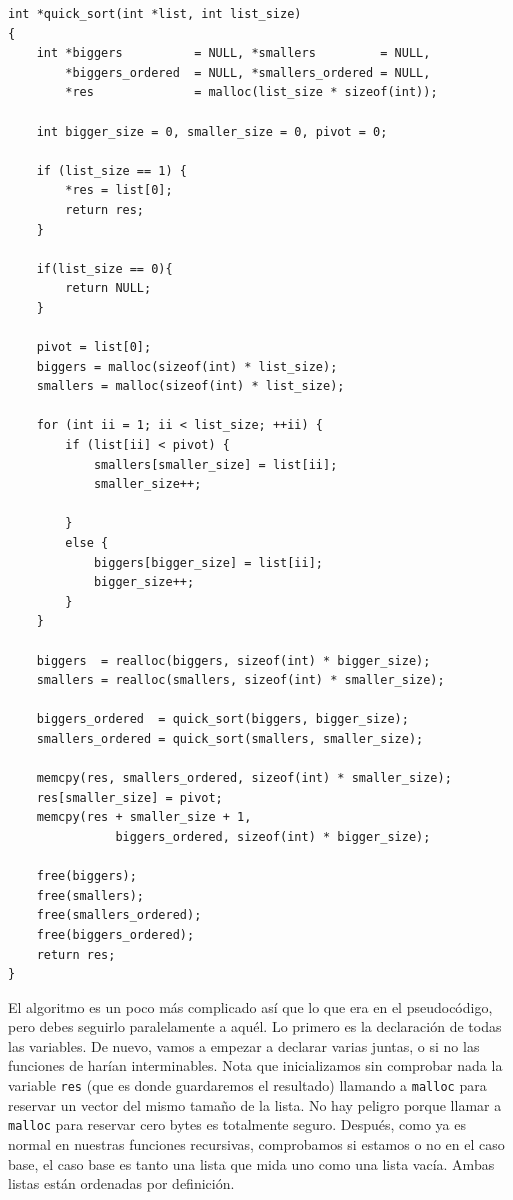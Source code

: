 \documentclass[a4paper]{article}
\begin{document}
\noindent
\begin{minipage}[H]{\linewidth}
\mbox{}
\begin{lstlisting}[style=C,
caption={Implementación de \textit{Quick Sort}},
label={lst:quick_sort}]
int *quick_sort(int *list, int list_size)
{
    int *biggers          = NULL, *smallers         = NULL,
        *biggers_ordered  = NULL, *smallers_ordered = NULL,
        *res              = malloc(list_size * sizeof(int));

    int bigger_size = 0, smaller_size = 0, pivot = 0;

    if (list_size == 1) {
        *res = list[0];
        return res;
    }

    if(list_size == 0){
        return NULL;
    }

    pivot = list[0];
    biggers = malloc(sizeof(int) * list_size);
    smallers = malloc(sizeof(int) * list_size);

    for (int ii = 1; ii < list_size; ++ii) {
        if (list[ii] < pivot) {
            smallers[smaller_size] = list[ii];
            smaller_size++;

        }
        else {
            biggers[bigger_size] = list[ii];
            bigger_size++;
        }
    }

    biggers  = realloc(biggers, sizeof(int) * bigger_size);
    smallers = realloc(smallers, sizeof(int) * smaller_size);

    biggers_ordered  = quick_sort(biggers, bigger_size);
    smallers_ordered = quick_sort(smallers, smaller_size);

    memcpy(res, smallers_ordered, sizeof(int) * smaller_size);
    res[smaller_size] = pivot;
    memcpy(res + smaller_size + 1,
               biggers_ordered, sizeof(int) * bigger_size);

    free(biggers);
    free(smallers);
    free(smallers_ordered);
    free(biggers_ordered);
    return res;
}
\end{lstlisting}
\end{minipage}

El algoritmo es un poco más complicado así que lo que era en el pseudocódigo,
pero debes seguirlo paralelamente a aquél. Lo primero es la declaración de todas
las variables. De nuevo, vamos a empezar a declarar varias juntas, o si no las
funciones de harían interminables. Nota que inicializamos sin comprobar
nada la variable \texttt{res} (que es donde guardaremos el resultado)
llamando a \texttt{malloc} para reservar un vector del mismo tamaño de la lista.
No hay peligro porque llamar a \texttt{malloc} para reservar cero bytes es
totalmente seguro. Después, como ya es normal en nuestras funciones recursivas,
comprobamos si estamos o no en el caso base, el caso base es tanto una lista
que mida uno como una lista vacía. Ambas listas están ordenadas por definición.
\end{document}

